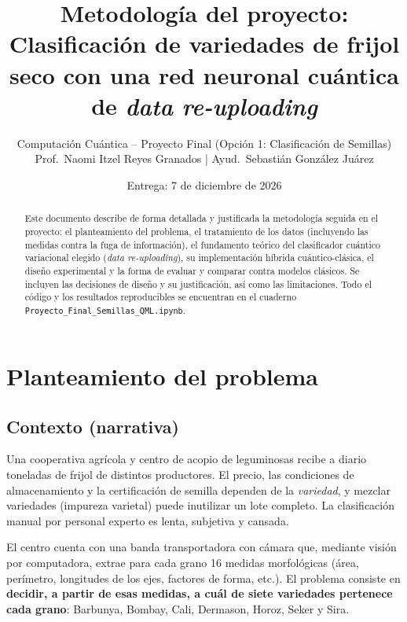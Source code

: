 \documentclass[11pt,letterpaper]{article}
\title{\textbf{Metodología del proyecto:}\\[2pt]
Clasificación de variedades de frijol seco con una red neuronal cuántica de \emph{data re-uploading}}
\author{Computación Cuántica -- Proyecto Final (Opción 1: Clasificación de Semillas)\\
Prof.\ Naomi Itzel Reyes Granados \;\;|\;\; Ayud.\ Sebastián González Juárez}
\date{Entrega: 7 de diciembre de 2026}
\begin{document}
\maketitle

\begin{abstract}
\noindent Este documento describe de forma detallada y justificada la metodología seguida en el
proyecto: el planteamiento del problema, el tratamiento de los datos (incluyendo las medidas contra
la fuga de información), el fundamento teórico del clasificador cuántico variacional elegido
(\emph{data re-uploading}), su implementación híbrida cuántico-clásica, el diseño experimental y la
forma de evaluar y comparar contra modelos clásicos. Se incluyen las decisiones de diseño y su
justificación, así como las limitaciones. Todo el código y los resultados reproducibles se
encuentran en el cuaderno \texttt{Proyecto\_Final\_Semillas\_QML.ipynb}.
\end{abstract}

\tableofcontents
\bigskip

\section{Planteamiento del problema}
\subsection{Contexto (narrativa)}
Una cooperativa agrícola y centro de acopio de leguminosas recibe a diario toneladas de frijol de
distintos productores. El precio, las condiciones de almacenamiento y la certificación de semilla
dependen de la \emph{variedad}, y mezclar variedades (impureza varietal) puede inutilizar un lote
completo. La clasificación manual por personal experto es lenta, subjetiva y cansada.

El centro cuenta con una banda transportadora con cámara que, mediante visión por computadora,
extrae para cada grano 16 medidas morfológicas (área, perímetro, longitudes de los ejes, factores de
forma, etc.). El problema consiste en \textbf{decidir, a partir de esas medidas, a cuál de siete
variedades pertenece cada grano}: Barbunya, Bombay, Cali, Dermason, Horoz, Seker y Sira.
\end{document}
